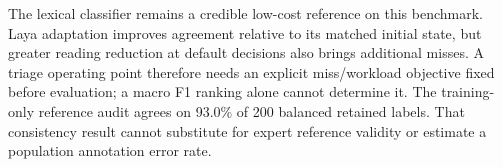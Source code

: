 The lexical classifier remains a credible low-cost reference on this benchmark. Laya adaptation improves agreement relative to its matched initial state, but greater reading reduction at default decisions also brings additional misses. A triage operating point therefore needs an explicit miss/workload objective fixed before evaluation; a macro F1 ranking alone cannot determine it. The training-only reference audit agrees on 93.0\% of 200 balanced retained labels. That consistency result cannot substitute for expert reference validity or estimate a population annotation error rate.
